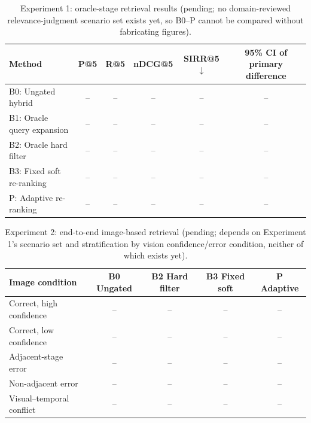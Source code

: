 \documentclass[conference]{IEEEtran}
\begin{document}
\begin{table}[t]
\caption{Experiment 1: oracle-stage retrieval results (pending; no domain-reviewed relevance-judgment scenario set exists yet, so B0--P cannot be compared without fabricating figures).}
\label{tab:oracle-results}
\centering
\footnotesize
\begin{tabular}{lccccc}
\toprule
Method & P@5 & R@5 & nDCG@5 & SIRR@5 $\downarrow$ & 95\% CI of primary difference \\
\midrule
B0: Ungated hybrid & -- & -- & -- & -- & -- \\
B1: Oracle query expansion & -- & -- & -- & -- & -- \\
B2: Oracle hard filter & -- & -- & -- & -- & -- \\
B3: Fixed soft re-ranking & -- & -- & -- & -- & -- \\
P: Adaptive re-ranking & -- & -- & -- & -- & -- \\
\bottomrule
\end{tabular}
\end{table}

\begin{table}[t]
\caption{Experiment 2: end-to-end image-based retrieval (pending; depends on Experiment 1's scenario set and stratification by vision confidence/error condition, neither of which exists yet).}
\label{tab:e2e-results}
\centering
\footnotesize
\begin{tabular}{lcccc}
\toprule
Image condition & B0 Ungated & B2 Hard filter & B3 Fixed soft & P Adaptive \\
\midrule
Correct, high confidence & -- & -- & -- & -- \\
Correct, low confidence & -- & -- & -- & -- \\
Adjacent-stage error & -- & -- & -- & -- \\
Non-adjacent error & -- & -- & -- & -- \\
Visual--temporal conflict & -- & -- & -- & -- \\
\bottomrule
\end{tabular}
\end{table}
\end{document}

